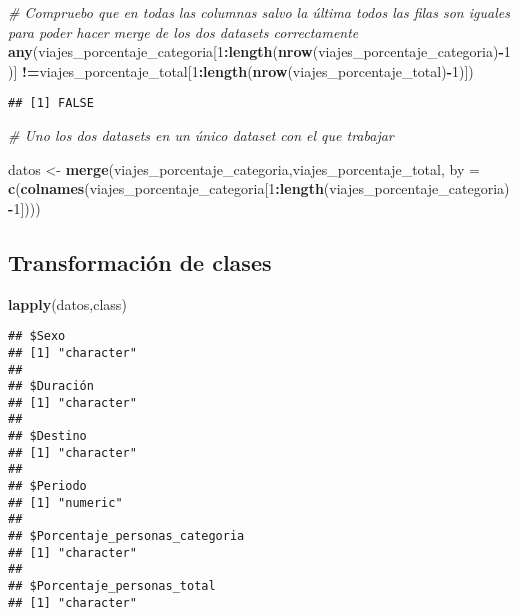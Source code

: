\documentclass[notspecified,article,submit,moreauthors,pdftex]{Definitions/mdpi}
\newenvironment{Shaded}{\begin{snugshade}}{\end{snugshade}}
\newcommand{\AttributeTok}[1]{\textcolor[rgb]{0.13,0.29,0.53}{#1}}
\newcommand{\CommentTok}[1]{\textcolor[rgb]{0.56,0.35,0.01}{\textit{#1}}}
\newcommand{\DecValTok}[1]{\textcolor[rgb]{0.00,0.00,0.81}{#1}}
\newcommand{\FunctionTok}[1]{\textcolor[rgb]{0.13,0.29,0.53}{\textbf{#1}}}
\newcommand{\NormalTok}[1]{#1}
\newcommand{\OtherTok}[1]{\textcolor[rgb]{0.56,0.35,0.01}{#1}}
\newcommand{\SpecialCharTok}[1]{\textcolor[rgb]{0.81,0.36,0.00}{\textbf{#1}}}
\begin{document}
\begin{Shaded}
\begin{Highlighting}[]
\CommentTok{\# Compruebo que en todas las columnas salvo la última todos las filas son iguales para poder hacer merge de los dos datasets correctamente}
\FunctionTok{any}\NormalTok{(viajes\_porcentaje\_categoria[}\DecValTok{1}\SpecialCharTok{:}\FunctionTok{length}\NormalTok{(}\FunctionTok{nrow}\NormalTok{(viajes\_porcentaje\_categoria)}\SpecialCharTok{{-}}\DecValTok{1}\NormalTok{)] }\SpecialCharTok{!=}\NormalTok{viajes\_porcentaje\_total[}\DecValTok{1}\SpecialCharTok{:}\FunctionTok{length}\NormalTok{(}\FunctionTok{nrow}\NormalTok{(viajes\_porcentaje\_total)}\SpecialCharTok{{-}}\DecValTok{1}\NormalTok{)])}
\end{Highlighting}
\end{Shaded}

\begin{verbatim}
## [1] FALSE
\end{verbatim}

\begin{Shaded}
\begin{Highlighting}[]
\CommentTok{\# Uno los dos datasets en un único dataset con el que trabajar}

\NormalTok{datos }\OtherTok{\textless{}{-}} \FunctionTok{merge}\NormalTok{(viajes\_porcentaje\_categoria,viajes\_porcentaje\_total, }\AttributeTok{by =} \FunctionTok{c}\NormalTok{(}\FunctionTok{colnames}\NormalTok{(viajes\_porcentaje\_categoria[}\DecValTok{1}\SpecialCharTok{:}\FunctionTok{length}\NormalTok{(viajes\_porcentaje\_categoria)}\SpecialCharTok{{-}}\DecValTok{1}\NormalTok{])))}
\end{Highlighting}
\end{Shaded}

\subsection{Transformación de clases}\label{transformaciuxf3n-de-clases}

\begin{Shaded}
\begin{Highlighting}[]
\FunctionTok{lapply}\NormalTok{(datos,class)}
\end{Highlighting}
\end{Shaded}

\begin{verbatim}
## $Sexo
## [1] "character"
## 
## $Duración
## [1] "character"
## 
## $Destino
## [1] "character"
## 
## $Periodo
## [1] "numeric"
## 
## $Porcentaje_personas_categoria
## [1] "character"
## 
## $Porcentaje_personas_total
## [1] "character"
\end{verbatim}
\end{document}
